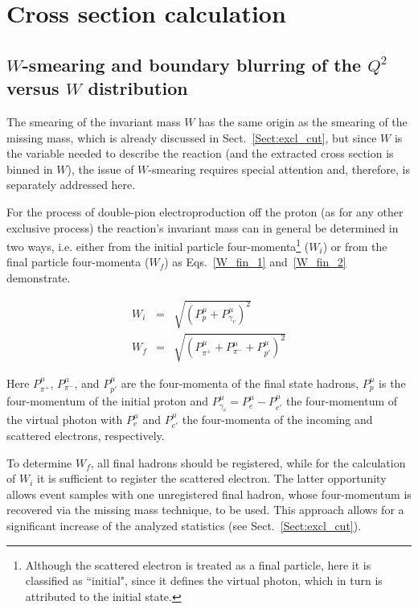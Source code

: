 \setcounter{chapter}{2}
\chapter{Cross section calculation}
\label{Sect:cr_sect}


\section{$W$-smearing and boundary blurring of the $Q^{2}$ versus $W$ distribution}
\label{Sect:smearing_blurring}

The smearing of the invariant mass $W$ has the same origin as the smearing of the missing mass, which is already discussed in Sect.~\ref{Sect:excl_cut}, but since $W$ is the variable needed to describe the reaction (and the extracted cross section is binned in $W$), the issue of $W$-smearing requires special attention and, therefore, is separately addressed here.


For the process of double-pion electroproduction off the proton (as for any other exclusive process) the reaction's invariant mass can in general be determined in two ways, i.e. either from the initial particle  four-momenta\footnote[1]{Although the scattered electron is treated as a final particle, here it is classified as ``initial", since it defines the virtual photon, which in turn is attributed to the initial state.} ($W_{i}$) or from the final particle  four-momenta ($W_{f}$) as Eqs.~\eqref{W_fin_1} and~\eqref{W_fin_2} demonstrate. 


\begin{eqnarray}
W_{i}&= & \sqrt{(P_{p}^{\mu}+P_{\gamma_{v}}^{\mu})^{2}} \label{W_fin_1} \\
W_{f}&= & \sqrt{(P_{\pi^{+}}^{\mu}+P_{\pi^{-}}^{\mu}+P_{p'}^{\mu})^{2}} \label{W_fin_2}
\end{eqnarray}

Here $P_{\pi^{+}}^{\mu}$, $P_{\pi^{-}}^{\mu}$, and $P_{p'}^{\mu}$ are the four-momenta of the final state hadrons, $P_{p}^{\mu}$ is the four-momentum of the initial proton and $P_{\gamma_{v}}^{\mu}=P_{e}^{\mu}-P_{e'}^{\mu}$ the four-momentum of the virtual photon with $P_{e}^{\mu}$ and $P_{e'}^{\mu}$ the four-momenta of the incoming and scattered electrons, respectively. 

To determine $W_{f}$, all final hadrons should be registered, while for the calculation of $W_{i}$ it is sufficient to register the scattered electron. The latter opportunity allows event samples with one unregistered final hadron, whose four-momentum is recovered via the missing mass technique, to be used. This approach allows for a significant increase of the analyzed statistics (see Sect.~\ref{Sect:excl_cut}).

